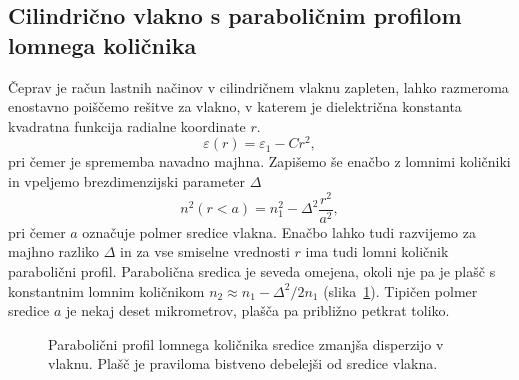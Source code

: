 \subsection*{Cilindrično vlakno s paraboličnim profilom lomnega količnika}
Čeprav je račun lastnih načinov v cilindričnem vlaknu zapleten, lahko 
razmeroma enostavno poiščemo rešitve za vlakno, v katerem je dielektrična 
konstanta kvadratna funkcija radialne koordinate $r$. 
\begin{equation}
\varepsilon (r) = \varepsilon_1 - C r^2,
\end{equation}
pri čemer je sprememba navadno majhna. Zapišemo še enačbo z lomnimi količniki
in vpeljemo brezdimenzijski parameter $\Delta$
\begin{equation}
n^2\left(r<a\right)=n_{1}^{2}- \Delta^2 \frac{r^2}{a^2},
\label{9.15}
\end{equation}
pri čemer $a$ označuje polmer sredice vlakna.
Enačbo lahko tudi razvijemo za majhno razliko $\Delta$ in za vse smiselne vrednosti $r$
ima tudi lomni količnik parabolični profil. Parabolična
sredica je seveda omejena, okoli nje pa je plašč s konstantnim
lomnim količnikom $n_2 \approx n_1-\Delta^2/2n_1$ (slika~\ref{fig:GRIN}). 
Tipičen polmer sredice $a$ je nekaj deset mikrometrov, plašča pa približno petkrat toliko.
\begin{figure}[h]
\centering
\def\svgwidth{90truemm} 
 
\caption{Parabolični profil lomnega količnika sredice zmanjša disperzijo v vlaknu. Plašč
 je praviloma bistveno debelejši od sredice vlakna.}
\label{fig:GRIN}
\end{figure}


